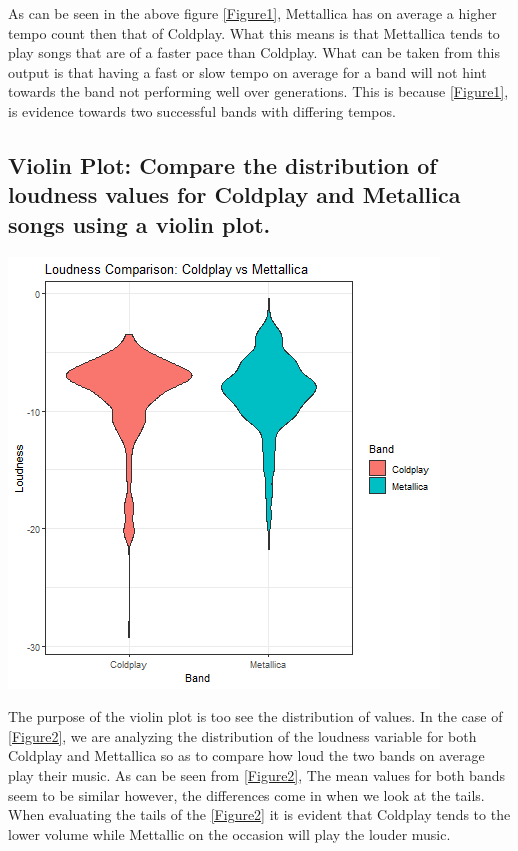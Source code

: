 \documentclass[11pt,preprint, authoryear]{elsarticle}
\let\origfigure\figure
\let\endorigfigure\endfigure
\renewenvironment{figure}[1][2] {
    \expandafter\origfigure\expandafter[H]
} {
    \endorigfigure
}
\numberwithin{equation}{section}
\numberwithin{figure}{section}
\numberwithin{table}{section}
\begin{document}
As can be seen in the above figure \ref{Figure1}, Mettallica has on
average a higher tempo count then that of Coldplay. What this means is
that Mettallica tends to play songs that are of a faster pace than
Coldplay. What can be taken from this output is that having a fast or
slow tempo on average for a band will not hint towards the band not
performing well over generations. This is because \ref{Figure1}, is
evidence towards two successful bands with differing tempos.

\hypertarget{violin-plot-compare-the-distribution-of-loudness-values-for-coldplay-and-metallica-songs-using-a-violin-plot.}{%
\subsection{Violin Plot: Compare the distribution of loudness values for
Coldplay and Metallica songs using a violin
plot.}\label{violin-plot-compare-the-distribution-of-loudness-values-for-coldplay-and-metallica-songs-using-a-violin-plot.}}

\begin{figure}[H]

{\centering \includegraphics{Question-3_files/figure-latex/Figure 2-1} 

}

\caption{Loudness distribution \label{Figure2}}\label{fig:Figure 2}
\end{figure}

The purpose of the violin plot is too see the distribution of values. In
the case of \ref{Figure2}, we are analyzing the distribution of the
loudness variable for both Coldplay and Mettallica so as to compare how
loud the two bands on average play their music. As can be seen from
\ref{Figure2}, The mean values for both bands seem to be similar
however, the differences come in when we look at the tails. When
evaluating the tails of the \ref{Figure2} it is evident that Coldplay
tends to the lower volume while Mettallic on the occasion will play the
louder music.
\end{document}
